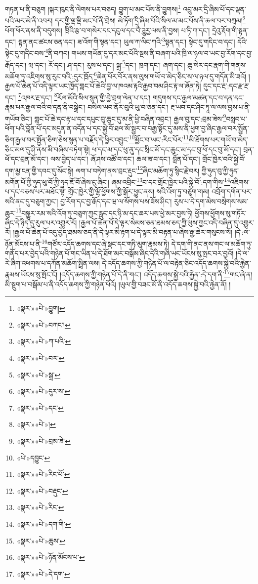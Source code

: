 གཏན་པ་ནི་བཅུག །སྐར་ཁུང་ནི་ལེགས་པར་བཅད། བྱུག་པ་མང་པོས་ནི་བྱུགས།\footnote{«སྣར་»«པེ་»བྱུག།} འབྲུ་མར་དྲི་ཞིམ་པོ་དང་ལྡན་པའི་མར་མེ་ནི་འབར། དར་གྱི་ལྡ་ལྡི་མང་པོ་ནི་བྲེས། མེ་ཏོག་དྲི་ཞིམ་པོའི་སིལ་མ་མང་པོས་ནི་ཆལ་བར་བཀྲམ།\footnote{«སྣར་»«པེ་»བཀང་།} པོག་ཕོར་ནས་ནི་བདུགས། ཁྲིའི་རྩ་བ་གསེར་དང་དངུལ་དང་བཻ་ཌཱུརྱ་ལས་ནི་བྱས། པ་ཏི་ཀ་དང་། དྲེའུ་རྡོག་གི་སྟན་དང་། སྟན་ནང་ཚངས་ཅན་དང་། ཟ་འོག་གི་སྟན་དང་། ཡུལ་ཀ་ལིང་ཀའི་\footnote{«སྣར་»«པེ་»ཀ་པའི་}སྟན་དང་། སྟེང་དུ་གདིང་བ་དང་། དེའི་སྟེང་དུ་གདིང་བས་\footnote{«སྣར་»«པེ་»བར་}ནི་བཀབ། གཡས་གཡོན་དུ་དར་མང་པོའི་སྔས་ནི་བཞག་པའི་ཁྲི་ལ་ཉལ་བ་ཡང་བྱ་རོག་དང་བྱ་རྒོད་དང་། ཝ་དང་། རོ་དང་། ཤ་དང་། རུས་པ་དང་། སྐྲ་\footnote{«སྣར་»«པེ་»སྒྲ་}དང་། ཁྲག་དང་། ཞག་དང་། ཆུ་སེར་དང་རྣག་གི་གནས་མཆོག་ཏུ་འཇིགས་སུ་རུང་བའི་:དུར་ཁྲོད་\footnote{«སྣར་»«པེ་»དུར་ས་}ཆེན་པོར་བོར་ནས་ལུས་གཡོ་བ་མེད་ཅིང་ས་ལ་ཉལ་དུ་གདོན་མི་ཟའོ། །རྒྱལ་པོ་ཆེན་པོ་འདི་ལྟར་ཡང་ཁྱོད་གླང་པོ་ཆེའི་བྱ་ལ་ཁའམ་རྟའི་རྒྱབ་བམ་ཤིང་རྟ་ལ་ཞོན་ཏེ། དུང་དང་རྔ་:དང་རྫ་རྔ་དང་། \footnote{«སྣར་»«པེ་»དང་}འཁར་རྔ་དང་། \footnote{«སྣར་»«པེ་»།  }རོལ་མོའི་སིལ་སྙན་གྱི་བྱེ་བྲག་ལེན་པ་དང་། གདུགས་དང་རྒྱལ་མཚན་དང་བ་དན་དང་རྣམ་པར་རྒྱལ་བའི་བ་དན་ནི་བསྒྲེང་། བསིལ་ཡབ་ནོར་བུའི་ཡུ་བ་ཅན་དང་། རྔ་ཡབ་དང་ཤིང་ཏཱ་ལ་ལས་བྱས་པ་ནི་གཡོབ་ཅིང་། གླང་པོ་ཆེ་དང་རྟ་པ་དང་དཔུང་བུ་ཆུང་དུ་མ་ནི་ཕྱི་བཞིན་འབྲང་། རྒྱལ་བུ་དང་:བྲམ་ཟེས་\footnote{«སྣར་»«པེ་»བྲམ་ཟེ་}བསླབ་པ་ཕོག་པའི་བློན་པོ་དང་མདུན་ན་འདོན་པ་དང་སྐྱེ་བོ་ཐལ་མོ་སྦྱར་བ་བརྒྱ་སྟོང་དུ་མས་ནི་ཕྱག་བྱ་ཞིང་རྒྱལ་བར་སྤྱོན་ཅིག་རྒྱལ་བར་སྤྱོན་ཅིག་ཅེས་སྙན་པ་བརྗོད་དེ་ཕྱིར་འབྱུང་\footnote{«པེ་»དབྱུང་}མྱོང་བ་ཡང་:རིང་པོར་\footnote{«སྣར་»«པེ་»རིང་པོ་}མི་ཐོགས་པར་གཡོ་བ་མེད་ཅིང་མལ་དུ་ཤི་ནས་མི་བཞིས་བཏེག་སྟེ། ཕ་དང་མ་དང་ཕུ་ནུ་དང་སྲིང་མོ་དང་ཆུང་མ་དང་བུ་ཕོ་དང་བུ་མོ་དང་། བྲན་ཕོ་དང་བྲན་མོ་དང་། ལས་བྱེད་པ་དང་། ཞོ་ཤས་འཚོ་བ་དང་། ཆལ་ཟ་བ་དང་། བློན་པོ་དང་། གྲོང་ཁྱེར་བའི་སྐྱེ་བོ་དག་མྱ་ངན་གྱི་དབང་དུ་སོང་སྟེ། ལག་པ་བཏེག་ནས་བྲང་རྡུང་\footnote{«སྣར་»«པེ་»བརྡུང་}ཞིང་མཆོག་ཏུ་སྙིང་རྗེ་བར། ཀྱི་ཧུད་བུ་ཀྱི་ཧུད་མགོན་པོ་ཀྱི་ཧུད་ཕུ་བོ་ཀྱི་ཧུད་ཇོ་བོ་ཞེས་ངུ་ཞིང་། ཞམ་འབྲིང་\footnote{«སྣར་»«པེ་»རིང་}བ་དང་གྲོང་ཁྱེར་པའི་སྐྱེ་བོ་:དག་གིས་\footnote{«སྣར་»«པེ་»དག་གི་}འཇིགས་པ་དང་བཅས་པར་མཐོང་སྟེ། གྲོང་ཁྱེར་གྱི་ལྷོ་ཕྱོགས་ཀྱི་སྒོར་ཕྱུང་ནས། སའི་འོག་ཏུ་བཅུག་གམ། འབྲོག་དགོན་པར་སའི་ནང་དུ་བཅུག་ཀྱང་། བྱ་རོག་དང་བྱ་རྒོད་དང་ཝ་ལ་སོགས་པས་ཟོས་ཤིང་། རུས་པ་དེ་དག་མེས་བསྲེགས་སམ་ཆུར་\footnote{«སྣར་»«པེ་»ཆུས་}བསྐྱུར་རམ་སའི་འོག་ཏུ་བཅུག་ཀྱང་རླུང་དང་ཉི་མ་དང་ཆར་པས་ཕྱེ་མར་བྱས་ཏེ། ཕྱོགས་ཕྱོགས་སུ་གཏོར་ཞིང་དེ་ཉིད་དུ་རུལ་པར་འགྱུར་རོ། །རྒྱལ་པོ་ཆེན་པོ་དེ་ལྟར་སེམས་ཅན་ཐམས་ཅད་ཀྱི་ལུས་ཀྱང་འདི་བཞིན་དུ་འགྱུར་རོ། །རྒྱལ་པོ་ཆེན་པོ་འདུ་བྱེད་ཐམས་ཅད་ནི་དེ་ལྟར་མི་རྟག་པ་དེ་ལྟར་མི་བརྟན་པ་ཞེས་རྒྱ་ཆེར་གསུངས་སོ། །དེ་:ལ་ཉོན་མོངས་པ་ནི་\footnote{«སྣར་»«པེ་»ཉོན་མོངས་པ་}གཙོར་འདོད་ཆགས་དང་ཞེ་སྡང་དང་གཏི་མུག་རྣམས་ཏེ། དེ་དག་གི་ནང་ནས་གང་ལ་མཆོག་ཏུ་གནོད་པར་བྱེད་པའི་གཉེན་པོ་གང་ཡིན་པ་དེ་ཐོག་མར་བསྒོམ་ཞིང་དེའི་གཞི་ཡང་ཡོངས་སུ་སྤང་བར་བྱའོ། །དེ་ལ་རེ་ཞིག་འཕགས་པ་དཀོན་མཆོག་སྤྲིན་ལས། དེ་འདོད་ཆགས་ཀྱི་གཉེན་པོ་ལ་བརྟེན་ཅིང་འདོད་ཆགས་སྐྱེ་བའི་རྐྱེན་རྣམས་ཡོངས་སུ་སྤོང་ངོ། །འདོད་ཆགས་ཀྱི་གཉེན་པོ་དེ་ནི་གང་། འདོད་ཆགས་སྐྱེ་བའི་རྐྱེན་:དེ་དག་ནི་\footnote{«སྣར་»«པེ་»དེ་དག་}གང་ཞེ་ན། མི་སྡུག་པ་བསྒོམ་པ་ནི་འདོད་ཆགས་ཀྱི་གཉེན་པོའོ། །ཡུལ་གྱི་བཟང་མོ་ནི་འདོད་ཆགས་སྐྱེ་བའི་རྐྱེན་ནོ། །
